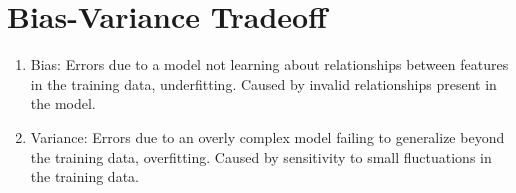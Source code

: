 \section{Bias-Variance Tradeoff}
\label{ml_general:bias_variance_tradeoff}

\begin{enumerate}[noitemsep]
  \item Bias: Errors due to a model not learning about relationships between features in the training data, \ie underfitting. Caused by invalid relationships present in the model.
  \item Variance: Errors due to an overly complex model failing to generalize beyond the training data, \ie overfitting. Caused by sensitivity to small fluctuations in the training data.
\end{enumerate}


